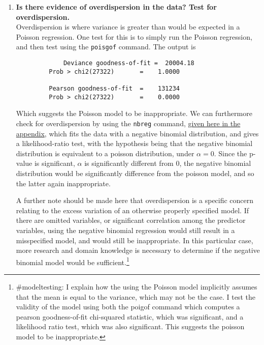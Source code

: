 \documentclass{article}
\begin{document}
\begin{enumerate}[label=(\alph*)]
Overall, the marginal effect estimates the were identical in sign and very similar in magnitude, though $\delta_{\text{addon}}$ and $\delta_{\text{bluec}}$ were not significant like they were in the Poisson model.\footnote{\#specification: I explain why the poisson model is more appropriate for count data that OLS. }\\



\item \textbf{Is there evidence of overdispersion in the data? Test for overdispersion.}\\

Overdispersion is where variance is greater than would be expected in a Poisson regression. One test for this is to simply run the Poisson regression, and then test using the \texttt{poisgof} command. The output is \begin{verbatim}
	         Deviance goodness-of-fit =  20004.18
         Prob > chi2(27322)       =    1.0000

         Pearson goodness-of-fit  =    131234
         Prob > chi2(27322)       =    0.0000
\end{verbatim}
Which suggests the Poisson model to be inappropriate. We can furthermore check for overdispersion by using the \texttt{nbreg} command, \hyperlink{nbreg}{given here in the appendix}, which fits the data with a negative binomial distribution, and gives a likelihood-ratio test, with the hypothesis being that the negative binomial distribution is equivalent to a poisson distribution, under $\alpha = 0$. Since the p-value is significant, $\alpha$ is significantly different from 0, the negative binomial distribution would be significantly difference from the poisson model, and so the latter again inappropriate.

A further note should be made here that overdispersion is a specific concern relating to the excess variation of an otherwise properly specified model. If there are omitted variables, or significant correlation among the predictor variables, using the negative binomial regression would still result in a misspecified  model, and would still be inappropriate. In this particular case, more research and domain knowledge is necessary to determine if the negative binomial model would be sufficient.\footnote{\#modeltesting: I explain how the using the Poisson model implicitly assumes that the mean is equal to the variance, which may not be the case. I test the validity of the model using both the poigof command which computes a pearson goodness-of-fit chi-squared statistic, which was significant, and a likelihood ratio test, which was also significant. This suggests the poisson model to be inappropriate.}


\end{enumerate}
\end{document}
